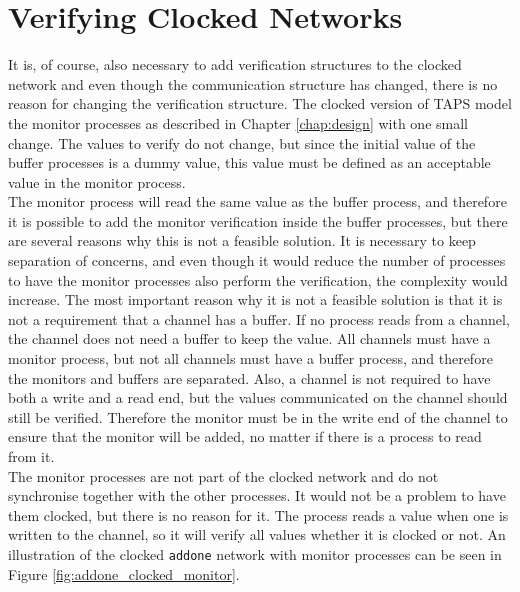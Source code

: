 \section{Verifying Clocked Networks}
It is, of course, also necessary to add verification structures to the clocked \cspm{} network and even though the communication structure has changed, there is no reason for changing the verification structure. The clocked version of TAPS model the monitor processes as described in Chapter \ref{chap:design} with one small change. The values to verify do not change, but since the initial value of the buffer processes is a dummy value, this value must be defined as an acceptable value in the monitor process. \\

The monitor process will read the same value as the buffer process, and therefore it is possible to add the monitor verification inside the buffer processes, but there are several reasons why this is not a feasible solution. It is necessary to keep separation of concerns, and even though it would reduce the number of processes to have the monitor processes also perform the verification, the complexity would increase. The most important reason why it is not a feasible solution is that it is not a requirement that a channel has a buffer. If no process reads from a channel, the channel does not need a buffer to keep the value. All channels must have a monitor process, but not all channels must have a buffer process, and therefore the monitors and buffers are separated.
Also, a channel is not required to have both a write and a read end, but the values communicated on the channel should still be verified. Therefore the monitor must be in the write end of the channel to ensure that the monitor will be added, no matter if there is a process to read from it. \\

The monitor processes are not part of the clocked network and do not synchronise together with the other processes. It would not be a problem to have them clocked, but there is no reason for it. The process reads a value when one is written to the channel, so it will verify all values whether it is clocked or not.
An illustration of the clocked \texttt{addone} network with monitor processes can be seen in Figure \ref{fig:addone_clocked_monitor}.


